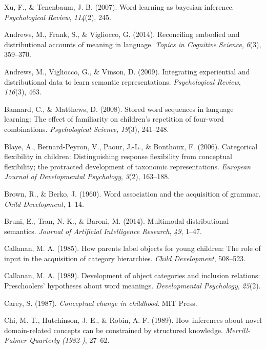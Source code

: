 \documentclass[english,,man]{apa6}
\begin{document}
\leavevmode\hypertarget{ref-xu2007word}{}%
Xu, F., \& Tenenbaum, J. B. (2007). Word learning as bayesian inference. \emph{Psychological Review}, \emph{114}(2), 245.

\leavevmode\hypertarget{ref-andrews2014}{}%
Andrews, M., Frank, S., \& Vigliocco, G. (2014). Reconciling embodied and distributional accounts of meaning in language. \emph{Topics in Cognitive Science}, \emph{6}(3), 359--370.

\leavevmode\hypertarget{ref-andrews2009integrating}{}%
Andrews, M., Vigliocco, G., \& Vinson, D. (2009). Integrating experiential and distributional data to learn semantic representations. \emph{Psychological Review}, \emph{116}(3), 463.

\leavevmode\hypertarget{ref-bannard2008}{}%
Bannard, C., \& Matthews, D. (2008). Stored word sequences in language learning: The effect of familiarity on children's repetition of four-word combinations. \emph{Psychological Science}, \emph{19}(3), 241--248.

\leavevmode\hypertarget{ref-blaye2006categorical}{}%
Blaye, A., Bernard-Peyron, V., Paour, J.-L., \& Bonthoux, F. (2006). Categorical flexibility in children: Distinguishing response flexibility from conceptual flexibility; the protracted development of taxonomic representations. \emph{European Journal of Developmental Psychology}, \emph{3}(2), 163--188.

\leavevmode\hypertarget{ref-brown1960word}{}%
Brown, R., \& Berko, J. (1960). Word association and the acquisition of grammar. \emph{Child Development}, 1--14.

\leavevmode\hypertarget{ref-bruni2014}{}%
Bruni, E., Tran, N.-K., \& Baroni, M. (2014). Multimodal distributional semantics. \emph{Journal of Artificial Intelligence Research}, \emph{49}, 1--47.

\leavevmode\hypertarget{ref-callanan1985}{}%
Callanan, M. A. (1985). How parents label objects for young children: The role of input in the acquisition of category hierarchies. \emph{Child Development}, 508--523.

\leavevmode\hypertarget{ref-callanan1989}{}%
Callanan, M. A. (1989). Development of object categories and inclusion relations: Preschoolers' hypotheses about word meanings. \emph{Developmental Psychology}, \emph{25}(2).

\leavevmode\hypertarget{ref-carey1987}{}%
Carey, S. (1987). \emph{Conceptual change in childhood}. MIT Press.

\leavevmode\hypertarget{ref-chi1989}{}%
Chi, M. T., Hutchinson, J. E., \& Robin, A. F. (1989). How inferences about novel domain-related concepts can be constrained by structured knowledge. \emph{Merrill-Palmer Quarterly (1982-)}, 27--62.
\end{document}
